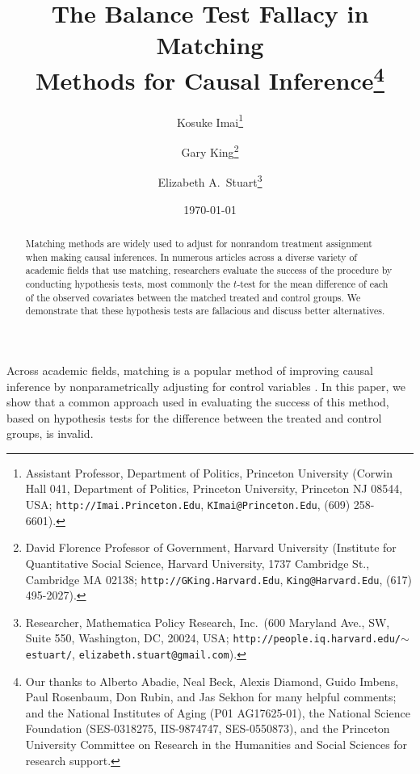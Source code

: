 \documentclass[11pt,titlepage]{article}
\title{The Balance Test Fallacy in Matching\\ Methods for Causal
  Inference\thanks{Our thanks to Alberto Abadie, Neal Beck, Alexis
    Diamond, Guido Imbens, Paul Rosenbaum, Don Rubin, and Jas Sekhon
    for many helpful comments; and the National Institutes of Aging
    (P01 AG17625-01), the National Science Foundation (SES-0318275,
    IIS-9874747, SES-0550873), and the Princeton University Committee
    on Research in the Humanities and Social Sciences for research
    support.}}
\author{Kosuke Imai\thanks{Assistant Professor, Department of
    Politics, Princeton University (Corwin Hall 041, Department of
    Politics, Princeton University, Princeton NJ 08544, USA;
    \texttt{http://Imai.Princeton.Edu}, \texttt{KImai@Princeton.Edu},
    (609) 258-6601).}
\and 
  Gary King\thanks{David Florence Professor of Government, Harvard
    University (Institute for Quantitative Social Science, Harvard
    University, 1737 Cambridge St., Cambridge MA 02138;
    \texttt{http://GKing.Harvard.Edu}, \texttt{King@Harvard.Edu},
    (617) 495-2027).}
\and 
  Elizabeth A.\ Stuart\thanks{Researcher, Mathematica Policy Research,
    Inc.\, (600 Maryland Ave., SW, Suite 550, Washington, DC, 20024,
    USA; \texttt{http://people.iq.harvard.edu/$\sim$estuart/},
    \texttt{elizabeth.stuart@gmail.com}).}}
\date{\today}
\begin{document}
\maketitle

\begin{abstract}
  Matching methods are widely used to adjust for nonrandom treatment
  assignment when making causal inferences.  In numerous articles
  across a diverse variety of academic fields that use matching,
  researchers evaluate the success of the procedure by conducting
  hypothesis tests, most commonly the $t$-test for the mean difference
  of each of the observed covariates between the matched treated and
  control groups. We demonstrate that these hypothesis tests are
  fallacious and discuss better alternatives.
\end{abstract}

Across academic fields, matching is a popular method of improving
causal inference by nonparametrically adjusting for control variables
\citep{Imbens04,Rosenbaum02}.  In this paper, we show that a common
approach used in evaluating the success of this method, based on
hypothesis tests for the difference between the treated and control
groups, is invalid.
\end{document}

